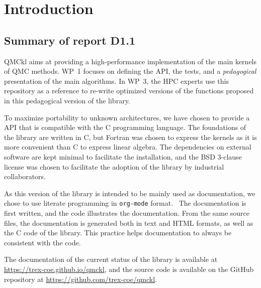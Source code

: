 \newcommand{\orgmode}{\texttt{org-mode}}
\newcommand{\Makefile}{\texttt{Makefile}}
\newcommand{\context}{\texttt{context}}
\newcommand{\CC}{C\nolinebreak\hspace{-.05em}\raisebox{.4ex}{\tiny\bf +}\nolinebreak\hspace{-.10em}\raisebox{.4ex}{\tiny\bf +}}
\def\CC{{C\nolinebreak[4]\hspace{-.05em}\raisebox{.4ex}{\tiny\bf ++}}}

\section{Introduction}

\subsection{Summary of report D1.1}

\Ac{QMCkl} aims at providing a high-performance
implementation of the main kernels of \ac{QMC} methods. 
\ac{WP}~1 focuses on defining the \ac{API}, the tests,
and a \emph{pedagogical} presentation of the main algorithms.
In \ac{WP}~3, the \ac{HPC} experts use this repository as a reference to re-write
optimized versions of the functions proposed in this pedagogical version of the library.

To maximize portability to unknown architectures, we have chosen to provide a \ac{API} that
is compatible with the C programming language. The foundations of the library are written in C, but Fortran
was chosen to express the kernels as it is more convenient than C to express linear algebra.
The dependencies on external software are kept minimal to facilitate the installation, and the
BSD 3-clause license was chosen to facilitate the adoption of the library by industrial 
collaborators.

As this version of the library is intended to be mainly used as documentation, 
we chose to use literate programming\cite{knuth_1992} in {\orgmode}
format.~\cite{schulte_2012,orgmode} The documentation
is first written, and the code illustrates the documentation. From the same source files,
the documentation is generated both in text and HTML formats, as well as the C code of the library.
This practice helps documentation to always be consistent with the code.

The documentation of the current status of the library is available
at \url{https://trex-coe.github.io/qmckl}, and the source code is
available on the GitHub repository at \url{https://github.com/trex-coe/qmckl}.

